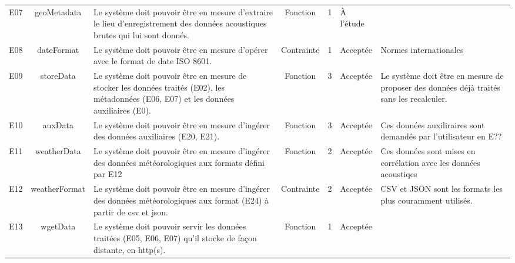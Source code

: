 \documentclass[a4paper]{article}
\begin{document}
\begin{longtable}{|c|c|p{4cm}|c|c|p{2cm}|p{4cm}|}
	E07 & geoMetadata       & Le système doit pouvoir être en mesure d’extraire le lieu d’enregistrement des données acoustiques brutes qui lui sont donnés.             & Fonction   & 1        & À l’étude &                                                                                                                                      \\
	E08 & dateFormat        & Le système doit pouvoir être en mesure d’opérer avec le format de date ISO 8601.                                                           & Contrainte & 1        & Acceptée  & Normes internationales                                                                                                               \\
	E09 & storeData         & Le système doit pouvoir être en mesure de stocker les données traités (E02), les métadonnées (E06, E07) et les données auxiliaires (E0).   & Fonction   & 3        & Acceptée  & Le système doit être en mesure de proposer des données déjà traités sans les recalculer.                                             \\
	E10 & auxData           & Le système doit pouvoir être en mesure d’ingérer des données auxiliaires (E20, E21).                                                       & Fonction   & 3        & Acceptée  & Ces données auxiliraires sont demandés par l’utilisateur en E??                                                                      \\
	E11 & weatherData       & Le système doit pouvoir être en mesure d’ingérer des données météorologiques aux formats défini par E12                                    & Fonction   & 2        & Acceptée  & Ces données sont mises en corrélation avec les données acoustiqes                                                                    \\
	E12 & weatherFormat     & Le système doit pouvoir être en mesure d’ingérer des données météorologiques aux format (E24) à partir de csv et json.                     & Contrainte & 2        & Acceptée  & CSV et JSON sont les formats les plus couramment utilisés.                                                                           \\
	E13 & wgetData          & Le système doit pouvoir servir les données traitées (E05, E06, E07) qu’il stocke de façon distante, en http(s).                            & Fonction   & 1        & Acceptée  &                                                                                                                                      \\

\end{longtable}
\end{document}
